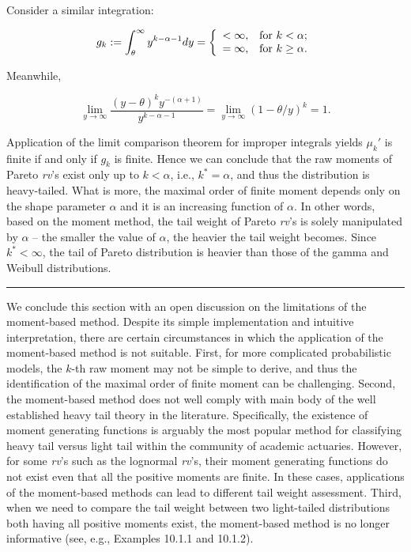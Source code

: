 \documentclass[]{book}
\theoremstyle{definition}
\theoremstyle{definition}
\theoremstyle{definition}
\theoremstyle{remark}
\begin{document}
Consider a similar integration:

\begin{eqnarray*}
  g_k:=\int_{\theta}^{\infty} {y^{k-\alpha-1}} dy=\left\{
  \begin{array}{ll}
    <\infty, & \hbox{for } k<\alpha;\\
    =\infty, & \hbox{for } k\geq \alpha.
  \end{array}
\right.
\end{eqnarray*}

Meanwhile,

\[\lim_{y\rightarrow \infty} \frac{(y-\theta)^k {y^{-(\alpha+1)}}}{y^{k-\alpha-1}}=\lim_{y\rightarrow \infty}
(1-\theta/y)^{k}=1.\]

Application of the limit comparison theorem for improper integrals
yields \(\mu_k'\) is finite if and only if \(g_k\) is finite. Hence we
can conclude that the raw moments of Pareto \emph{rv}'s exist only up to
\(k<\alpha\), i.e., \(k^{\ast}=\alpha\), and thus the distribution is
heavy-tailed. What is more, the maximal order of finite moment depends
only on the shape parameter \(\alpha\) and it is an increasing function
of \(\alpha\). In other words, based on the moment method, the tail
weight of Pareto \emph{rv}'s is solely manipulated by \(\alpha\) -- the
smaller the value of \(\alpha\), the heavier the tail weight becomes.
Since \(k^{\ast}<\infty\), the tail of Pareto distribution is heavier
than those of the gamma and Weibull distributions.

\begin{center}\rule{0.5\linewidth}{\linethickness}\end{center}

We conclude this section with an open discussion on the limitations of
the moment-based method. Despite its simple implementation and intuitive
interpretation, there are certain circumstances in which the application
of the moment-based method is not suitable. First, for more complicated
probabilistic models, the \(k\)-th raw moment may not be simple to
derive, and thus the identification of the maximal order of finite
moment can be challenging. Second, the moment-based method does not well
comply with main body of the well established heavy tail theory in the
literature. Specifically, the existence of moment generating functions
is arguably the most popular method for classifying heavy tail versus
light tail within the community of academic actuaries. However, for some
\emph{rv}'s such as the lognormal \emph{rv}'s, their moment generating
functions do not exist even that all the positive moments are finite. In
these cases, applications of the moment-based methods can lead to
different tail weight assessment. Third, when we need to compare the
tail weight between two light-tailed distributions both having all
positive moments exist, the moment-based method is no longer informative
(see, e.g., Examples 10.1.1 and 10.1.2).
\end{document}

